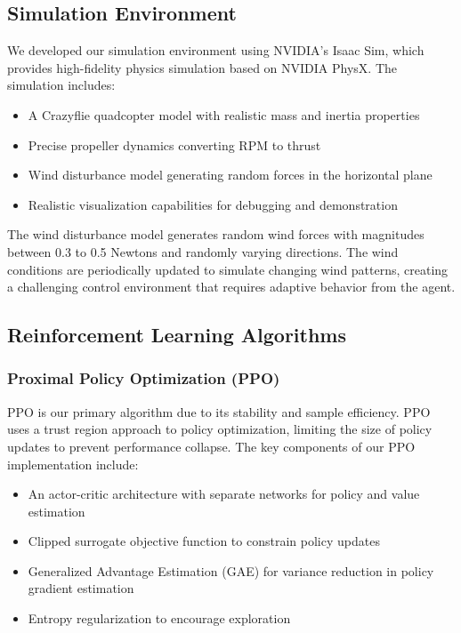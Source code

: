 \documentclass[12pt]{article}
\begin{document}
\subsection{Simulation Environment}

We developed our simulation environment using NVIDIA's Isaac Sim, which provides high-fidelity physics simulation based on NVIDIA PhysX. The simulation includes:

\begin{itemize}
    \item A Crazyflie quadcopter model with realistic mass and inertia properties
    \item Precise propeller dynamics converting RPM to thrust
    \item Wind disturbance model generating random forces in the horizontal plane
    \item Realistic visualization capabilities for debugging and demonstration
\end{itemize}

The wind disturbance model generates random wind forces with magnitudes between 0.3 to 0.5 Newtons and randomly varying directions. The wind conditions are periodically updated to simulate changing wind patterns, creating a challenging control environment that requires adaptive behavior from the agent.

\subsection{Reinforcement Learning Algorithms}
\subsubsection{Proximal Policy Optimization (PPO)}

PPO is our primary algorithm due to its stability and sample efficiency. PPO uses a trust region approach to policy optimization, limiting the size of policy updates to prevent performance collapse. The key components of our PPO implementation include:

\begin{itemize}
    \item An actor-critic architecture with separate networks for policy and value estimation
    \item Clipped surrogate objective function to constrain policy updates
    \item Generalized Advantage Estimation (GAE) for variance reduction in policy gradient estimation
    \item Entropy regularization to encourage exploration
\end{itemize}
\end{document}
